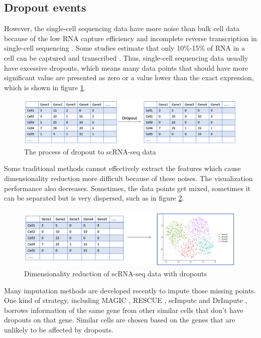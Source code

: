 \subsection{Dropout events}

However, the single-cell sequencing data have more noise than bulk cell data because of the low RNA capture efficiency and incomplete reverse transcription in single-cell sequencing \cite{Peng2019}. Some studies estimate that only 10\%-15\% of RNA in a cell can be captured and transcribed \cite{zheng2017massively}. Thus, single-cell sequencing data usually have excessive dropouts, which means many data points that should have more significant value are presented as zero or a value lower than the exact expression, which is shown in figure \ref{dropout}.

\begin{figure}[htb!]
    \centering
    \includegraphics[width=1\textwidth]{figures/myfigures/dropout.png}
    \caption{The process of dropout to scRNA-seq data}
    \label{dropout}
\end{figure}

Some traditional methods cannot effectively extract the features which cause dimensionality reduction more difficult because of these noises. The visualization performance also decreases. Sometimes, the data points get mixed, sometimes it can be separated but is very dispersed, such as in figure \ref{dr2}.

\begin{figure}[htb!]
    \centering
    \includegraphics[width=1\textwidth]{figures/myfigures/dr2.png}
    \caption{Dimensionality reduction of scRNA-seq data with dropouts}
    \label{dr2}
\end{figure}

Many imputation methods are developed recently to impute those missing points. One kind of strategy, including MAGIC \cite{van2017magic}, RESCUE \cite{Tracy2019}, scImpute \cite{Li2018} and DrImpute \cite{gong2018drimpute}, borrows information of the same gene from other similar cells that don't have dropouts on that gene. Similar cells are chosen based on the genes that are unlikely to be affected by dropouts.

